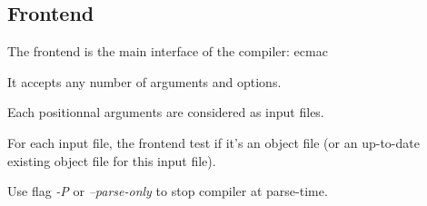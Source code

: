 \documentclass{article}
\begin{document}
        \subsection{Frontend}

            The frontend is the main interface of the compiler: ecmac

            It accepts any number of arguments and options.

            Each positionnal arguments are considered as input files.

            For each input file, the frontend test if it's an object file (or an up-to-date existing object file for this input file).

            \begin{notice}
                Use flag \emph{-P} or \emph{--parse-only} to stop compiler at parse-time.
            \end{notice}

    \newpage
    \printindex
\end{document}
